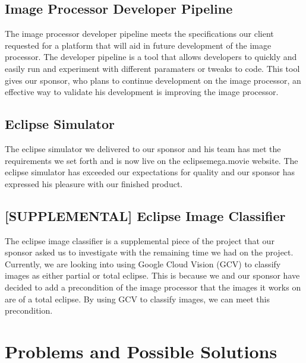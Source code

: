 \documentclass[10pt, onecolumn, draftclsnofoot, letterpaper, compsoc]{IEEEtran}
\begin{document}
\subsection{Image Processor Developer Pipeline}

The image processor developer pipeline meets the specifications our client
requested for a platform that will aid in future development of the image
processor. The developer pipeline is a tool that allows developers to quickly
and easily run and experiment with different paramaters or tweaks to code. This
tool gives our sponsor, who plans to continue development on the image processor,
an effective way to validate his development is improving the image processor. \\

\subsection{Eclipse Simulator}

The eclipse simulator we delivered to our sponsor and his team has met the
requirements we set forth and is now live on the eclipsemega.movie website. The
eclipse simulator has exceeded our expectations for quality and our sponsor has
expressed his pleasure with our finished product. \\

\subsection{[SUPPLEMENTAL] Eclipse Image Classifier}

The eclipse image classifier is a supplemental piece of the project that our
sponsor asked us to investigate with the remaining time we had on the project.
Currently, we are looking into using Google Cloud Vision (GCV) to classify images
as either partial or total eclipse. This is because we and our sponsor have
decided to add a precondition of the image processor that the images it works
on are of a total eclipse. By using GCV to classify images, we can meet this
precondition. \\

\section{Problems and Possible Solutions}


\end{document}
